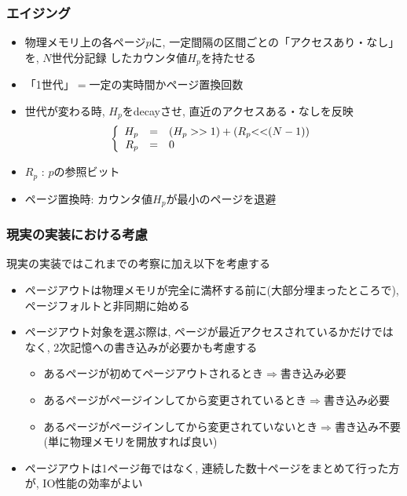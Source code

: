 \documentclass[12pt,dvipdfmx]{beamer}
\begin{document}
\begin{frame}
  \frametitle{エイジング}
  \begin{itemize}
  \item 物理メモリ上の各ページ$p$に, 一定間隔の区間ごとの「アクセスあり・なし」を,
    $N$世代分記録
    したカウンタ値$H_p$を持たせる

    \begin{center}
    \def\svgwidth{0.5\textwidth}
    \only<2>{{\tiny}}%
    \end{center}
  \item 「1世代」$=$一定の実時間かページ置換回数
  \item<2-> 世代が変わる時, $H_p$をdecayさせ, 直近のアクセスある・なしを反映
    \[\left\{\begin{array}{rcl}
             H_p & = & (H_p >> 1) + (R_p {\tt <<} (N-1)) \\
             R_p & = & 0
    \end{array}\right.\]
  \item<2-> $R_p$ : $p$の参照ビット
  \item<3-> ページ置換時: カウンタ値$H_p$が最小のページを退避
  \end{itemize}
\end{frame}

\begin{frame}
  \frametitle{現実の実装における考慮}
現実の実装ではこれまでの考察に加え以下を考慮する
\begin{itemize}
\item ページアウトは物理メモリが完全に満杯する前に(大部分埋まったところで),
  ページフォルトと非同期に始める
\item ページアウト対象を選ぶ際は, ページが最近アクセスされているかだけではなく,
  2次記憶への書き込みが必要かも考慮する
  \begin{itemize}
  \item あるページが初めてページアウトされるとき$\Rightarrow$書き込み必要
  \item あるページがページインしてから変更されているとき$\Rightarrow$書き込み必要
  \item あるページがページインしてから変更されていないとき$\Rightarrow$書き込み不要
    (単に物理メモリを開放すれば良い)
  \end{itemize}
\item ページアウトは1ページ毎ではなく, 連続した数十ページをまとめて行った方が,
  IO性能の効率がよい
\end{itemize}
\end{frame}
\end{document}

